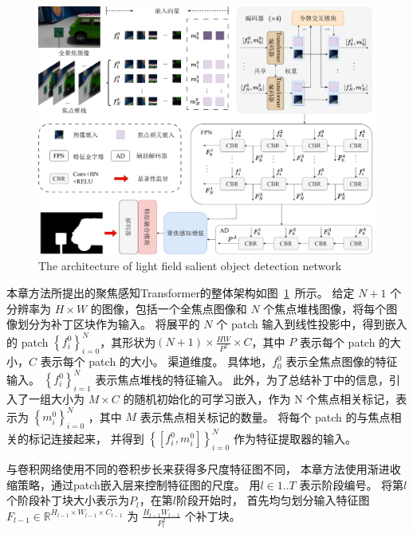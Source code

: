 \begin{figure}[!ht]
	\centering
	\includegraphics[width=0.95\linewidth]{figures/chapter3/overview_1}
	{The architecture of light field salient object detection network}  
	\label{cpt3_fig1:overview}
\end{figure}




本章方法所提出的聚焦感知Transformer的整体架构如图~\ref{cpt3_fig1:overview}~所示。
给定 $N + 1$ 个分辨率为 $ H \times W $ 的图像，包括一个全焦点图像和 $N$ 个焦点堆栈图像，将每个图像划分为补丁区块作为输入。 
将展平的 $N$ 个 patch 输入到线性投影中，得到嵌入的 patch $ \left \{ f_{i}^{0} \right \}_{i=0}^{N} $，其形状为$ \left ( N + 1 \right ) \times \frac{HW}{P^{2}} \times C  $，其中 $P$ 表示每个 patch 的大小，$C$ 表示每个 patch 的大小。 
渠道维度。 
%
%
%
具体地，$ f_{0}^{0} $ 表示全焦点图像的特征输入。 
$ \left \{ f_{i}^{0} \right \}_{i=1}^{N} $ 表示焦点堆栈的特征输入。 
此外，为了总结补丁中的信息，引入了一组大小为 $ M \times C $ 的随机初始化的可学习嵌入，作为 { }N 个焦点相关标记，表示为 $ \left \{ m_{i}^{0} \right \}_{i=0}^{N} $ ，其中 $M$ 表示焦点相关标记的数量。 
将每个 patch 的与焦点相关的标记连接起来，
并得到 $ \left \{ \left [ f_{i}^{0},m_{i}^{0}  \right ]  \right \}_{i=0}^{N} $ 作为特征提取器的输入。 




与卷积网络使用不同的卷积步长来获得多尺度特征图不同，
本章方法使用渐进收缩策略，通过patch嵌入层来控制特征图的尺度。
用$ l \in 1..T $ 表示阶段编号。 
将第$l$个阶段补丁块大小表示为$P_{l}$，在第$l$阶段开始时，
首先均匀划分输入特征图
$F_{l-1} \in \mathbb{R}^{H_{l-1} \times W_{l-1} \times C_{l-1}}$
为
$ \frac{H_{l-1}W_{l-1}}{P_{l}^{2}} $
个补丁块。





